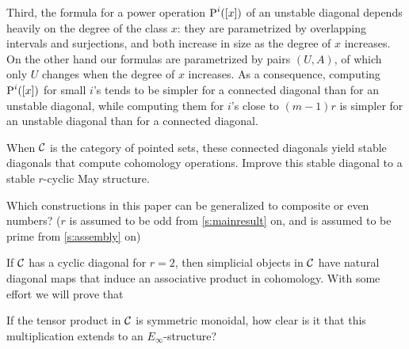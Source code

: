 Third, the formula for a power operation $\operatorname{P}^i([x])$ of an unstable diagonal depends heavily on the degree of the class $x$: they are parametrized by overlapping intervals and surjections, and both increase in size as the degree of $x$ increases.
On the other hand our formulas are parametrized by pairs $(U,A)$, of which only $U$ changes when the degree of $x$ increases.
As a consequence, computing $\operatorname{P}^i([x])$ for small $i$'s tends to be simpler for a connected diagonal than for an unstable diagonal, while computing them for $i$'s close to $(m-1)r$ is simpler for an unstable diagonal than for a connected diagonal.
\begin{question}
	When $\mathcal{C}$ is the category of pointed sets, these connected diagonals yield stable diagonals that compute cohomology operations.
	Improve this stable diagonal to a stable $r$-cyclic May structure.
\end{question}
\begin{question}
	Which constructions in this paper can be generalized to composite or even numbers? ($r$ is assumed to be odd from \cref{s:mainresult} on, and is assumed to be prime from \cref{s:assembly} on)
\end{question}
If $\mathcal{C}$ has a cyclic diagonal for $r= 2$, then simplicial objects in $\mathcal{C}$ have natural diagonal maps that induce an associative product in cohomology.
With some effort we will prove that


If the tensor product in $\mathcal{C}$ is symmetric monoidal, how clear is it that this multiplication extends to an $E_{\infty}$-structure? 

